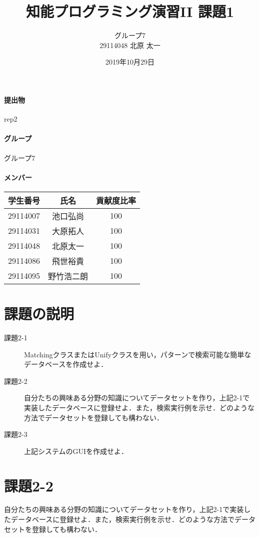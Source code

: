 \documentclass{jarticle}
\title{知能プログラミング演習II 課題1}
\author{グループ7\\
  29114048 北原 太一\\
}
\date{2019年10月29日}
\begin{document}
\maketitle

\paragraph{提出物} rep2
\paragraph{グループ} グループ7
\paragraph{メンバー}
\begin{tabular}{|c|c|c|}
  \hline
  学生番号&氏名&貢献度比率\\
  \hline\hline
  29114007&池口弘尚&100\\
  \hline
  29114031&大原拓人&100\\
  \hline
  29114048&北原太一&100\\
  \hline
  29114086&飛世裕貴&100\\
  \hline
  29114095&野竹浩二朗&100\\
  \hline
\end{tabular}

\section{課題の説明}
\begin{description}
\item[課題2-1] MatchingクラスまたはUnifyクラスを用い，パターンで検索可能な簡単なデータベースを作成せよ．
\item[課題2-2] 自分たちの興味ある分野の知識についてデータセットを作り，上記2-1で実装したデータベースに登録せよ．また，検索実行例を示せ．どのような方法でデータセットを登録しても構わない．
\item[課題2-3] 上記システムのGUIを作成せよ．
\end{description}


\section{課題2-2}
\begin{screen}
  自分たちの興味ある分野の知識についてデータセットを作り，上記2-1で実装したデータベースに登録せよ．また，検索実行例を示せ．どのような方法でデータセットを登録しても構わない．
\end{screen}
\end{document}
